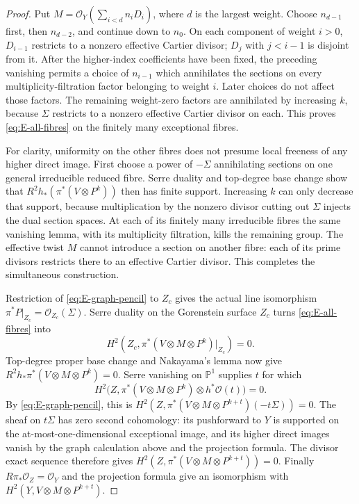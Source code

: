 \begin{proof}
Put $M=\mathcal O_Y(\sum_{i<d}n_iD_i)$, where $d$ is the largest
weight. Choose $n_{d-1}$ first, then $n_{d-2}$, and continue down to
$n_0$. On each component of weight $i>0$, $D_{i-1}$ restricts to a
nonzero effective Cartier divisor; $D_j$ with $j<i-1$ is disjoint
from it. After the higher-index coefficients have been fixed, the
preceding vanishing permits a choice of $n_{i-1}$ which annihilates
the sections on every multiplicity-filtration factor belonging to
weight $i$. Later choices do not affect those factors. The remaining
weight-zero factors are annihilated by increasing $k$, because
$\Sigma$ restricts to a nonzero effective Cartier divisor on each.
This proves \eqref{eq:E-all-fibres} on the finitely many exceptional
fibres.

For clarity, uniformity on the other fibres does not presume local
freeness of any higher direct image. First choose a power of
$-\Sigma$ annihilating sections on one general irreducible reduced fibre. Serre
duality and top-degree base change show that
$R^2h_*(\pi^*(V\otimes P^k))$ then has finite support. Increasing $k$
can only decrease that support, because multiplication by the
nonzero divisor cutting out $\Sigma$ injects the dual section spaces.
At each of its finitely many irreducible fibres the same vanishing
lemma, with its multiplicity filtration, kills the remaining group.
The effective twist $M$ cannot introduce a section on another fibre:
each of its prime divisors restricts there to an effective Cartier
divisor. This completes the simultaneous construction.

Restriction of \eqref{eq:E-graph-pencil} to $Z_c$ gives the actual line
isomorphism $\pi^*P|_{Z_c}=\mathcal O_{Z_c}(\Sigma)$. Serre duality
on the Gorenstein surface $Z_c$ turns \eqref{eq:E-all-fibres} into
\[
 H^2(Z_c,\pi^*(V\otimes M\otimes P^k)|_{Z_c})=0.
\]
Top-degree proper base change and Nakayama's lemma now give
$R^2h_*\pi^*(V\otimes M\otimes P^k)=0$. Serre vanishing on
$\mathbb P^1$ supplies $t$ for which
\[
 H^2\bigl(Z,\pi^*(V\otimes M\otimes P^k)
                       \otimes h^*\mathcal O(t)\bigr)=0.
\]
By \eqref{eq:E-graph-pencil}, this is
$H^2(Z,\pi^*(V\otimes M\otimes P^{k+t})(-t\Sigma))=0$.
The sheaf on $t\Sigma$ has zero second cohomology: its pushforward to
$Y$ is supported on the at-most-one-dimensional exceptional image,
and its higher direct images vanish by the graph calculation above
and the projection formula. The divisor exact sequence therefore
gives
$H^2(Z,\pi^*(V\otimes M\otimes P^{k+t}))=0$. Finally
$R\pi_*\mathcal O_Z=\mathcal O_Y$ and the projection formula give
an isomorphism with $H^2(Y,V\otimes M\otimes P^{k+t})$.


\end{proof}
